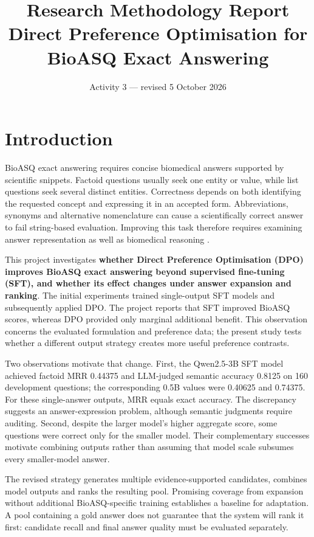 \documentclass[12pt,a4paper]{article}
\title{\textbf{Research Methodology Report}\\[0.6em]
\large Direct Preference Optimisation for BioASQ Exact Answering}
\author{}
\date{Activity 3 --- revised 5 October 2026}
\begin{document}
\maketitle


\section{Introduction}

BioASQ exact answering requires concise biomedical answers supported by scientific snippets. Factoid questions usually seek one entity or value, while list questions seek several distinct entities. Correctness depends on both identifying the requested concept and expressing it in an accepted form. Abbreviations, synonyms and alternative nomenclature can cause a scientifically correct answer to fail string-based evaluation. Improving this task therefore requires examining answer representation as well as biomedical reasoning \citep{tsatsaronis2015bioasq}.

This project investigates \textbf{whether Direct Preference Optimisation (DPO) improves BioASQ exact answering beyond supervised fine-tuning (SFT), and whether its effect changes under answer expansion and ranking}. The initial experiments trained single-output SFT models and subsequently applied DPO. The project reports that SFT improved BioASQ scores, whereas DPO provided only marginal additional benefit. This observation concerns the evaluated formulation and preference data; the present study tests whether a different output strategy creates more useful preference contrasts.

Two observations motivate that change. First, the Qwen2.5-3B SFT model achieved factoid MRR 0.44375 and LLM-judged semantic accuracy 0.8125 on 160 development questions; the corresponding 0.5B values were 0.40625 and 0.74375. For these single-answer outputs, MRR equals exact accuracy. The discrepancy suggests an answer-expression problem, although semantic judgments require auditing. Second, despite the larger model's higher aggregate score, some questions were correct only for the smaller model. Their complementary successes motivate combining outputs rather than assuming that model scale subsumes every smaller-model answer.

The revised strategy generates multiple evidence-supported candidates, combines model outputs and ranks the resulting pool. Promising coverage from expansion without additional BioASQ-specific training establishes a baseline for adaptation. A pool containing a gold answer does not guarantee that the system will rank it first: candidate recall and final answer quality must be evaluated separately.
\end{document}
